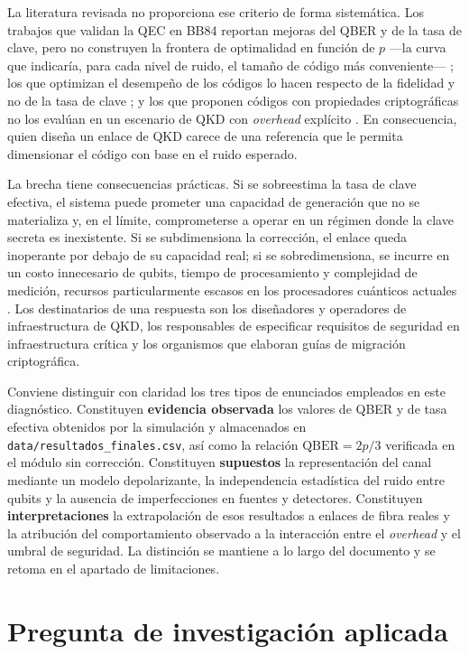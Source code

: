 \documentclass[12pt]{report}
\begin{document}
La literatura revisada no proporciona ese criterio de forma sistemática. Los
trabajos que validan la QEC en BB84 reportan mejoras del QBER y de la tasa de
clave, pero no construyen la frontera de optimalidad en función de $p$ —la curva
que indicaría, para cada nivel de ruido, el tamaño de código más conveniente—
\citep{jayachandran2025}; los que optimizan el desempeño de los códigos lo hacen
respecto de la fidelidad y no de la tasa de clave \citep{zheng2024}; y los que
proponen códigos con propiedades criptográficas no los evalúan en un escenario de
QKD con \textit{overhead} explícito \citep{matsui2025}. En consecuencia, quien
diseña un enlace de QKD carece de una referencia que le permita dimensionar el
código con base en el ruido esperado.

La brecha tiene consecuencias prácticas. Si se sobreestima la tasa de clave
efectiva, el sistema puede prometer una capacidad de generación que no se
materializa y, en el límite, comprometerse a operar en un régimen donde la clave
secreta es inexistente. Si se subdimensiona la corrección, el enlace queda
inoperante por debajo de su capacidad real; si se sobredimensiona, se incurre en
un costo innecesario de qubits, tiempo de procesamiento y complejidad de
medición, recursos particularmente escasos en los procesadores cuánticos
actuales \citep{preskill2018, fowler2012}. Los destinatarios de una respuesta son
los diseñadores y operadores de infraestructura de QKD, los responsables de
especificar requisitos de seguridad en infraestructura crítica y los organismos
que elaboran guías de migración criptográfica.

Conviene distinguir con claridad los tres tipos de enunciados empleados en este
diagnóstico. Constituyen \textbf{evidencia observada} los valores de QBER y de
tasa efectiva obtenidos por la simulación y almacenados en
\texttt{data/resultados\_finales.csv}, así como la relación $\mathrm{QBER}=2p/3$
verificada en el módulo sin corrección. Constituyen \textbf{supuestos} la
representación del canal mediante un modelo depolarizante, la independencia
estadística del ruido entre qubits y la ausencia de imperfecciones en fuentes y
detectores. Constituyen \textbf{interpretaciones} la extrapolación de esos
resultados a enlaces de fibra reales y la atribución del comportamiento observado
a la interacción entre el \textit{overhead} y el umbral de seguridad. La distinción
se mantiene a lo largo del documento y se retoma en el apartado de limitaciones.

\section{Pregunta de investigación aplicada}
\end{document}
